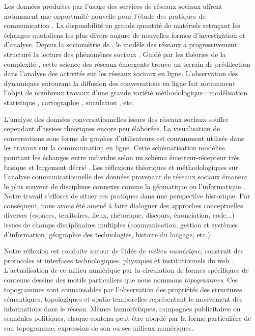 Les données produites par l'usage des services de réseaux sociaux offrent notamment une opportunité nouvelle pour l'étude des pratiques de communication \citep{Zook2007,Nettleton2013,Manovich2011}. La disponibilité en grande quantité de matériels retraçant les échanges quotidiens les plus divers augure de nouvelles formes d'investigation et d'analyse. Depuis la sociométrie de \cite{Moreno1938}, le modèle des réseaux a progressivement structuré la lecture des phénomènes sociaux \citep{Latour1999a, Castells1989}. Guidé par les théories de la complexité \citep{Morin1990}, cette science des réseaux émergente \citep{Brandes2013} trouve un terrain de prédilection dans l'analyse des activités sur les réseaux sociaux en ligne. L'observation des dynamiques entourant la diffusion des conversations en ligne fait notamment l'objet de nombreux travaux d'une grande variété méthodologique : modélisation statistique \citep{Steyer2006}, cartographie \citep{Conover2013,Eisenstein2012},  simulation \citep{Tubaro2010}, etc. 

L'analyse des données conversationnelles issues des réseaux sociaux souffre cependant d'assises théoriques encore peu élaborées. La visualisation de conversations sous forme de graphes d'utilisateurs est couramment utilisée dans les travaux sur la communication en ligne. Cette schématisation modélise pourtant les échanges entre individus selon un schéma émetteur-récepteur très basique et largement décrié \citep{Proulx2000}. Les réflexions théoriques et méthodologiques sur l'analyse communicationnelle des données provenant de réseaux sociaux émanent le plus souvent de disciplines connexes comme la géomatique \citep{Crampton2013, Leetaru2013} ou l'informatique \citep{Brodka2013, Russel2011}. Notre travail s'efforce de situer ces pratiques dans une perspective historique. Par conséquent, nous avons été amené à faire dialoguer des approches conceptuelles diverses (espaces, territoires, lieux, rhétorique, discours, énonciation, code...) issues de champs disciplinaires multiples (communication, gestion et systèmes d'information, géographie des technologies, histoire du langage, etc.)

Notre réflexion est conduite autour de l'idée de \textit{milieu numérique}, construit des protocoles et interfaces technologiques, physiques et institutionnels du web \cite{Hui2012}. L'actualisation de ce milieu numérique par la circulation de formes spécifiques de contenus dessine des motifs particuliers que nous nommons \textit{topogrammes}. Ces topogrammes sont connaissables par l'observation des propriétés des structures sémantiques, topologiques et spatio-temporelles représentant le mouvement des informations dans le réseau. Mèmes humoristiques, campagnes publicitaires ou scandales politiques, chaque contenu peut être abordé par la forme particulière de son topogramme, expression de son ou ses milieux numériques.



